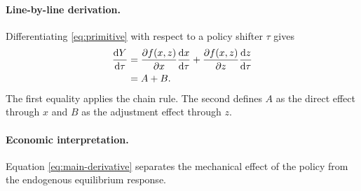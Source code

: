 \documentclass[11pt]{article}
\numberwithin{equation}{section}
\theoremstyle{definition}
\theoremstyle{remark}
\newcommand{\dd}{\mathrm{d}}
\newcommand{\pd}{\partial}
\newcommand{\1}{\mathds{1}}
\begin{document}
\paragraph{Line-by-line derivation.}
Differentiating \eqref{eq:primitive} with respect to a policy shifter \(\tau\) gives
\begin{align}
  \frac{\dd Y}{\dd \tau}
  &= \frac{\pd f(x,z)}{\pd x}\frac{\dd x}{\dd \tau}
   + \frac{\pd f(x,z)}{\pd z}\frac{\dd z}{\dd \tau} \notag\\
  &= A + B. \label{eq:main-derivative}
\end{align}
The first equality applies the chain rule. The second defines \(A\) as the direct effect through \(x\) and \(B\) as the adjustment effect through \(z\).

\paragraph{Economic interpretation.}
Equation \eqref{eq:main-derivative} separates the mechanical effect of the policy from the endogenous equilibrium response.
\end{document}
